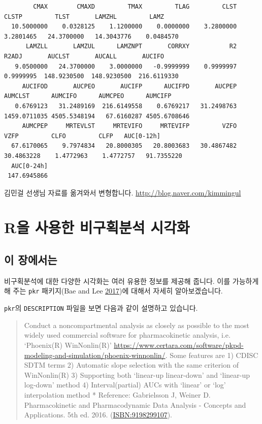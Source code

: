 \documentclass[12pt,]{krantz}
\theoremstyle{definition}
\theoremstyle{definition}
\theoremstyle{definition}
\theoremstyle{remark}
\begin{document}
\begin{verbatim}
        CMAX        CMAXD         TMAX         TLAG         CLST        CLSTP         TLST       LAMZHL         LAMZ 
  10.5000000    0.0328125    1.1200000    0.0000000    3.2800000    3.2801465   24.3700000   14.3043776    0.0484570 
      LAMZLL       LAMZUL      LAMZNPT       CORRXY           R2        R2ADJ       AUCLST       AUCALL       AUCIFO 
   9.0500000   24.3700000    3.0000000   -0.9999999    0.9999997    0.9999995  148.9230500  148.9230500  216.6119330 
     AUCIFOD       AUCPEO       AUCIFP      AUCIFPD       AUCPEP      AUMCLST      AUMCIFO      AUMCPEO      AUMCIFP 
   0.6769123   31.2489169  216.6149558    0.6769217   31.2498763 1459.0711035 4505.5348194   67.6160287 4505.6708646 
     AUMCPEP     MRTEVLST     MRTEVIFO     MRTEVIFP         VZFO         VZFP         CLFO         CLFP   AUC[0-12h] 
  67.6170065    9.7974834   20.8000305   20.8003683   30.4867482   30.4863228    1.4772963    1.4772757   91.7355220 
  AUC[0-24h] 
 147.6945866 
\end{verbatim}

김민걸 선생님 자료를 옮겨와서 변형합니다.
\url{http://blog.naver.com/kimmingul}

\chapter{R을 사용한 비구획분석 시각화}\label{pkr}

\section{이 장에서는}\label{summary-pkr}

비구획분석에 대한 다양한 시각화는 여러 유용한 정보를 제공해 줍니다. 이를
가능하게 해 주는 \texttt{pkr} 패키지(Bae and Lee
\protect\hyperlink{ref-R-pkr}{2017})에 대해서 자세히 알아보겠습니다.

\texttt{pkr}의 \texttt{DESCRIPTION} 파일을 보면 다음과 같이 설명하고
있습니다.

\begin{quote}
Conduct a noncompartmental analysis as closely as possible to the most
widely used commercial software for pharmacokinetic analysis, i.e.
`Phoenix(R) WinNonlin(R)'
\url{https://www.certara.com/software/pkpd-modeling-and-simulation/phoenix-winnonlin/}.
Some features are 1) CDISC SDTM terms 2) Automatic slope selection with
the same criterion of WinNonlin(R) 3) Supporting both `linear-up
linear-down' and `linear-up log-down' method 4) Interval(partial) AUCs
with `linear' or `log' interpolation method * Reference: Gabrielsson J,
Weiner D. Pharmacokinetic and Pharmacodynamic Data Analysis - Concepts
and Applications. 5th ed. 2016. (\url{ISBN:9198299107}).
\end{quote}
\end{document}
